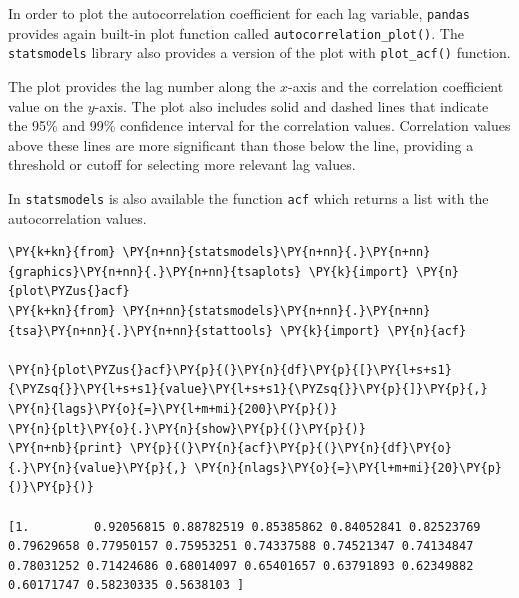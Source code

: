 In order to plot the autocorrelation coefficient for each lag variable,
\texttt{pandas} provides again built-in plot function called
\texttt{autocorrelation\_plot()}.
The \texttt{statsmodels} library also provides a version of the plot with
\texttt{plot\_acf()} function.

The plot provides the lag number along the \(x\)-axis and the
correlation coefficient value on the \(y\)-axis. The
plot also includes solid and dashed lines that indicate the 95\% and
99\% confidence interval for the correlation values. Correlation values
above these lines are more significant than those below the line,
providing a threshold or cutoff for selecting more relevant lag values.

In \texttt{statsmodels} is also available the function \texttt{acf} which 
returns a list with the autocorrelation values.
%
%

\begin{tcolorbox}[breakable, size=fbox, boxrule=1pt, pad at break*=1mm,colback=cellbackground, colframe=cellborder]
\begin{Verbatim}[commandchars=\\\{\}]
\PY{k+kn}{from} \PY{n+nn}{statsmodels}\PY{n+nn}{.}\PY{n+nn}{graphics}\PY{n+nn}{.}\PY{n+nn}{tsaplots} \PY{k}{import} \PY{n}{plot\PYZus{}acf}
\PY{k+kn}{from} \PY{n+nn}{statsmodels}\PY{n+nn}{.}\PY{n+nn}{tsa}\PY{n+nn}{.}\PY{n+nn}{stattools} \PY{k}{import} \PY{n}{acf}

\PY{n}{plot\PYZus{}acf}\PY{p}{(}\PY{n}{df}\PY{p}{[}\PY{l+s+s1}{\PYZsq{}}\PY{l+s+s1}{value}\PY{l+s+s1}{\PYZsq{}}\PY{p}{]}\PY{p}{,} \PY{n}{lags}\PY{o}{=}\PY{l+m+mi}{200}\PY{p}{)}
\PY{n}{plt}\PY{o}{.}\PY{n}{show}\PY{p}{(}\PY{p}{)}
\PY{n+nb}{print} \PY{p}{(}\PY{n}{acf}\PY{p}{(}\PY{n}{df}\PY{o}{.}\PY{n}{value}\PY{p}{,} \PY{n}{nlags}\PY{o}{=}\PY{l+m+mi}{20}\PY{p}{)}\PY{p}{)}

[1.         0.92056815 0.88782519 0.85385862 0.84052841 0.82523769
0.79629658 0.77950157 0.75953251 0.74337588 0.74521347 0.74134847
0.78031252 0.71424686 0.68014097 0.65401657 0.63791893 0.62349882
0.60171747 0.58230335 0.5638103 ]
\end{Verbatim}
\end{tcolorbox}
    
